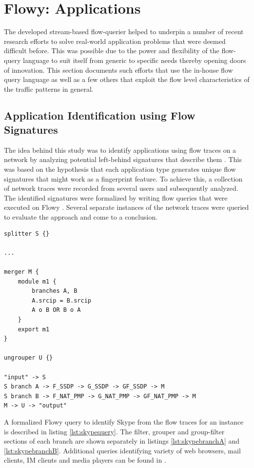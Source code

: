 \chapter{Flowy: Applications}\label{ch:flowy-applications}

The developed stream-based flow-querier helped to underpin a number of recent research efforts to solve real-world application problems that were deemed difficult before. This was possible due to the power and flexibility of the flow-query language to suit itself from generic to specific needs thereby opening doors of innovation. This section documents such efforts that use the in-house flow query language as well as a few others that exploit the flow level characteristics of the traffic patterns in general. 

\section{Application Identification using Flow 
Signatures}\label{sec:application-signatures}
The idea behind this study was to identify applications using flow traces on a network by analyzing potential left-behind signatures that describe them \cite{vperelman:2011, vperelman:thesis:2010}. This was based on the hypothesis that each application type generates unique flow signatures that might work as a fingerprint feature. To achieve this, a collection of network traces were recorded from several users and subsequently analyzed. The identified signatures were formalized by writing flow queries that were executed on Flowy \cite{kkanev:2010}. Several separate instances of the network traces were queried to evaluate the approach and come to a conclusion. 

\begin{lstlisting}
splitter S {}
	
...

merger M {
	module m1 {
		branches A, B
		A.srcip = B.srcip
		A o B OR B o A
	}
	export m1
}

ungrouper U {}
		
"input" -> S
S branch A -> F_SSDP -> G_SSDP -> GF_SSDP -> M
S branch B -> F_NAT_PMP -> G_NAT_PMP -> GF_NAT_PMP -> M
M -> U -> "output"
\end{lstlisting}
A formalized Flowy query to identify Skype from the flow traces for an instance is described in listing \ref{lst:skypequery}. The filter, grouper and group-filter sections of each branch are shown separately in listings \ref{lst:skypebranchA} and \ref{lst:skypebranchB}. Additional queries identifying variety of web browsers, mail clients, IM clients and media players can be found in \cite{vperelman:thesis:2010}.

